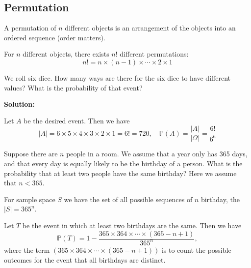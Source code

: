 \subsection{Permutation}

\begin{definition}[Permutation]
    A permutation of \(n\) different objects is an arrangement of the objects into an ordered sequence (order matters).
\end{definition}

\begin{proposition}
    For \(n\) different objects, there exists \(n!\) different permutations:
    \[
        n! = n \times (n-1) \times \cdots \times 2 \times 1
    \]
\end{proposition}

\begin{eg}
    We roll six dice. How many ways are there for the six dice to have different values? What is the probability of that event?
    
    \textbf{Solution:}
    
    Let \(A\) be the desired event. Then we have
    \[
        \vert A \vert = 6 \times 5 \times 4 \times 3 \times 2 \times 1 = 6! = 720, \quad \mathbb{P}(A) = \dfrac{\vert A \vert }{\vert \Omega \vert } = \dfrac{6!}{6^6}
    \]
\end{eg}

\begin{eg}
    Suppose there are \(n\) people in a room. We assume that a year only has 365 days, and that every day is equally likely to be the birthday of a person. What is the probability that at least two people have the same birthday? Here we assume that \(n < 365\). 

    For sample space \(S\) we have the set of all possible sequences of \(n\) birthday, the \(\vert S \vert = 365^n\). 

    Let \(T\) be the event in which at least two birthdays are the same. Then we have
    \[
        \mathbb{P}(T) = 1 - \dfrac{365 \times 364 \times \cdots \times (365 - n + 1)}{365^n},
    \]
    where the term \((365 \times 364 \times \cdots \times (365 - n + 1))\) is to count the possible outcomes for the event that all birthdays are distinct.
\end{eg}

